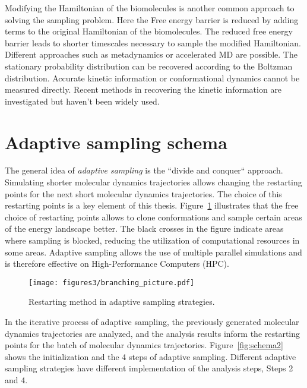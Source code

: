 Modifying the Hamiltonian of the biomolecules is another common approach to solving the sampling problem. Here the Free energy barrier is reduced by adding terms to the original Hamiltonian of the biomolecules.
The reduced free energy barrier leads to shorter timescales necessary to sample the modified Hamiltonian. Different approaches such as metadynamics \cite{laio2008metadynamics} or accelerated MD\cite{hamelberg2004accelerated} are possible. The stationary probability distribution can be recovered according to the Boltzman distribution. Accurate kinetic information or conformational dynamics cannot be measured directly. Recent methods in recovering the kinetic information\cite{pathreweight1, pathreweight2, pathreweight3, pathreweight4} are investigated but haven't been widely used. 



\section{\label{sec:design}Adaptive sampling schema}


The general idea of \emph{adaptive sampling} \cite{singhal2005error, bowman2010enhanced,
weber2011characterization, Fabritiis-2014, preto2014fast, doerr2016htmd,
AdaptivePELE-Lecina2017, EvolutionCoupling-Shamsi2017, FAST-Bowman-2015, 
Strategies-erros-reduce, plattner2017complete, Adstrategies2018} is the ``divide and conquer`` approach. Simulating shorter molecular dynamics trajectories allows changing the restarting points for the next short molecular dynamics trajectories. The choice of this restarting points is a key element of this thesis. Figure~\ref{fig:branching} illustrates that the free choice of restarting points allows to clone conformations and sample certain areas of the energy landscape better. The black crosses in the figure indicate areas where sampling is blocked, reducing the utilization of computational resources in some areas.
Adaptive sampling allows the use of multiple parallel simulations and is therefore effective on High-Performance Computers (HPC).

\begin{figure}[h]
  \centering
  \texttt{[image: figures3/branching\_picture.pdf]}
  \caption{Restarting method in adaptive sampling strategies.}
  \label{fig:branching}
\end{figure}


In the iterative process of adaptive sampling, the previously generated molecular dynamics trajectories are analyzed, and the analysis results inform the restarting points for the batch of
molecular dynamics trajectories. Figure~\ref{fig:schema2} shows the initialization and the 4 steps of adaptive sampling. Different adaptive sampling strategies have different implementation of the analysis steps, Steps 2 and 4. 

